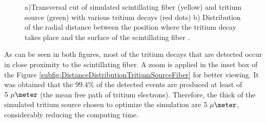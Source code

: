 \begin{figure}[h]
 \centering
 \caption{a)Transversal cut of simulated scintillating fiber (yellow) and tritium source (green) with various tritium decays (red dots) b) Distribution of the radial distance between the position where the tritium decay takes place and the surface of the scintillating fiber \cite{SimulationPaperCarlos}.}
 \label{fig:TritiumSourceSimulated}
\end{figure}	

As can be seen in both figures, most of the tritium decays that are detected occur in close proximity to the scintillating fiber.  A zoom is applied in the inset box of the Figure \ref{subfig:DistanceDistributionTritiumSourceFiber} for better viewing. It was obtained that the $99.4\%$ of the detected events are produced at least of $5~\mu\meter$ (the mean free path of tritium electrons). Therefore, the thick of the simulated tritium source chosen to optimize the simulation are $5~\mu\meter$, considerably reducing the computing time. 


